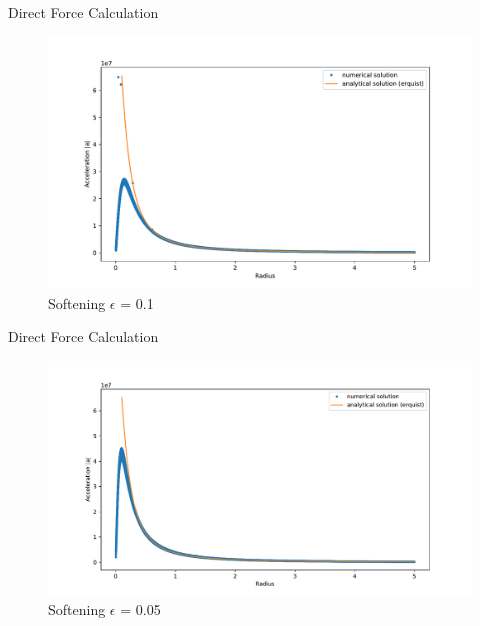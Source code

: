 \documentclass{beamer}
\begin{document}
\begin{frame}{Direct Force Calculation}
\begin{figure}
	\centering
	\includegraphics[width=1.0\linewidth]{hernquist2}
	\caption{Softening $\epsilon$ = 0.1}
	\label{fig:hernquist2}
\end{figure}
\end{frame}

\begin{frame}{Direct Force Calculation}
\begin{figure}
	\centering
	\includegraphics[width=1.0\linewidth]{hern_soft_05}
	\caption{Softening $\epsilon$ = 0.05}
	\label{fig:he3}
\end{figure}
\end{frame}
\end{document}
